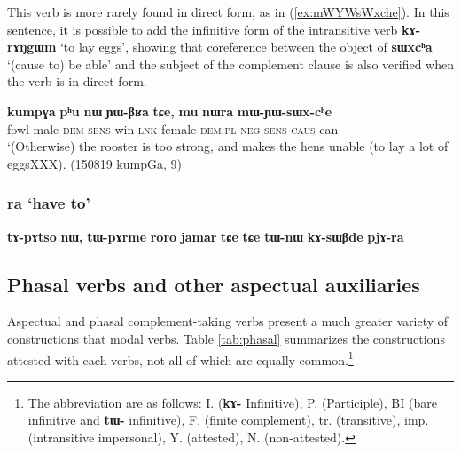 \documentclass[oneside,a4paper,11pt]{article}
\newcommand{\ipa}[1]{\textbf{\phon#1}} %
\newcommand{\jpg}[2]{\ipa{#1} `#2'} %
\newcommand{\refb}[1]{(\ref{#1})}
\begin{document}
This verb is more rarely found in direct form, as in \refb{ex:mWYWsWxche}. In this sentence, it is possible to add the infinitive form of the intransitive verb \jpg{kɤ-rɤŋgɯm}{to lay eggs}, showing that coreference between the object of \jpg{sɯxcʰa}{(cause to) be able} and the subject of the complement clause is also verified when the verb is in direct form.

\begin{exe}
\ex \label{ex:mWYWsWxche}
\gll 
\ipa{kumpɣa} 	\ipa{pʰu} 	\ipa{nɯ} 	\ipa{ɲɯ-βʁa} 	\ipa{tɕe,} 	\ipa{mu} 	\ipa{nɯra} 	\ipa{mɯ-ɲɯ-sɯx-cʰe} \\
fowl male \textsc{dem} \textsc{sens}-win \textsc{lnk} female \textsc{dem:pl} \textsc{neg-sens-caus}-can \\
\glt `(Otherwise) the rooster is too strong, and makes the hens unable (to lay a lot of eggsXXX). (150819 kumpGa, 9)
\end{exe}
 

  \subsubsection{\jpg{ra}{have to}} \label{sec:ra}
  \ipa{tɤ-pɤtso} 	\ipa{nɯ,} 	\ipa{tɯ-pɤrme} 	\ipa{roro} 	\ipa{jamar} 	\ipa{tɕe} 	\ipa{tɕe} 	\ipa{tɯ-nɯ} 	\ipa{kɤ-sɯβde} 	\ipa{pjɤ-ra} 
  
  \subsection{Phasal verbs and other aspectual auxiliaries}
Aspectual and phasal complement-taking verbs present a  much greater variety of constructions that modal verbs. Table \ref{tab:phasal} summarizes the constructions attested with each verbs, not all of which are equally common.\footnote{The abbreviation are as follows: 	I. (\ipa{kɤ-} Infinitive), P.  (Participle), 	BI (bare infinitive and \ipa{tɯ-} infinitive), 	F. (finite complement), tr. (transitive), imp. (intransitive impersonal), Y. (attested), N. (non-attested).  }  
\end{document}
